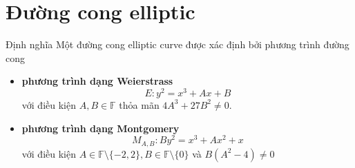 \documentclass[compress]{beamer}
\begin{document}
\section{Đường cong elliptic}
\begin{frame}{Định nghĩa}
Một đường cong elliptic curve được xác định bởi phương trình đường cong
\begin{itemize}
\item \textbf{phương trình dạng Weierstrass}
\begin{displaymath}
E: y^2 = x^3 + Ax + B
\end{displaymath}
với điều kiện $A, B \in \mathbb{F}$ thỏa mãn $4A^3 + 27B^2 \neq 0$.
\item \textbf{phương trình dạng Montgomery}
\begin{displaymath}
M_{A,B}: By^2 = x^3 + Ax^2 + x 
\end{displaymath}
với điều kiện $A \in \mathbb{F} \setminus \{-2, 2\}, B 	\in \mathbb{F} \setminus \{0\}$ và $B(A^2 - 4) \neq 0$ 
\end{itemize}
\end{frame}
\end{document}
